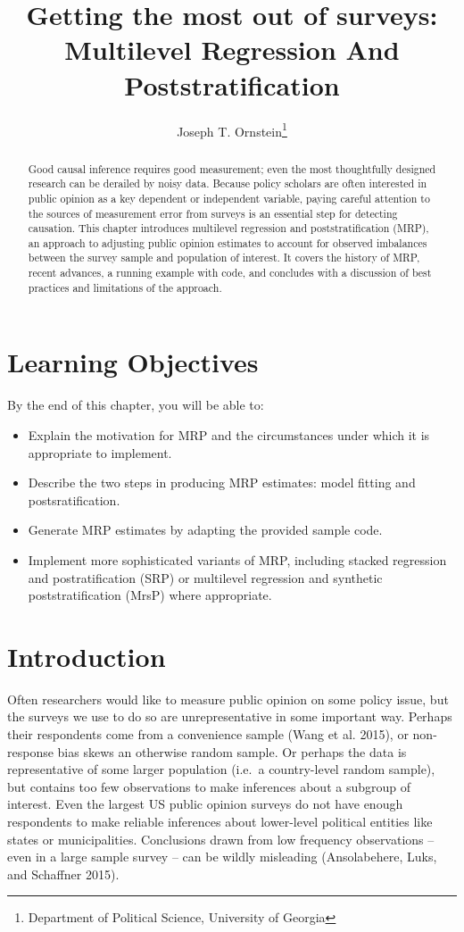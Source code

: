 \documentclass[
]{article}
\title{Getting the most out of surveys: Multilevel Regression And
Poststratification}
\author{Joseph T. Ornstein\footnote{Department of Political Science,
  University of Georgia}}
\date{}
\begin{document}
\maketitle
\begin{abstract}
Good causal inference requires good measurement; even the most
thoughtfully designed research can be derailed by noisy data. Because
policy scholars are often interested in public opinion as a key
dependent or independent variable, paying careful attention to the
sources of measurement error from surveys is an essential step for
detecting causation. This chapter introduces multilevel regression and
poststratification (MRP), an approach to adjusting public opinion
estimates to account for observed imbalances between the survey sample
and population of interest. It covers the history of MRP, recent
advances, a running example with code, and concludes with a discussion
of best practices and limitations of the approach.
\end{abstract}

\hypertarget{learning-objectives}{%
\section{Learning Objectives}\label{learning-objectives}}

By the end of this chapter, you will be able to:

\begin{itemize}
\item
  Explain the motivation for MRP and the circumstances under which it is
  appropriate to implement.
\item
  Describe the two steps in producing MRP estimates: model fitting and
  postsratification.
\item
  Generate MRP estimates by adapting the provided sample code.
\item
  Implement more sophisticated variants of MRP, including stacked
  regression and postratification (SRP) or multilevel regression and
  synthetic poststratification (MrsP) where appropriate.
\end{itemize}

\hypertarget{introduction}{%
\section{Introduction}\label{introduction}}

Often researchers would like to measure public opinion on some policy
issue, but the surveys we use to do so are unrepresentative in some
important way. Perhaps their respondents come from a convenience sample
(Wang et al. 2015), or non-response bias skews an otherwise random
sample. Or perhaps the data is representative of some larger population
(i.e.~a country-level random sample), but contains too few observations
to make inferences about a subgroup of interest. Even the largest US
public opinion surveys do not have enough respondents to make reliable
inferences about lower-level political entities like states or
municipalities. Conclusions drawn from low frequency observations --
even in a large sample survey -- can be wildly misleading (Ansolabehere,
Luks, and Schaffner 2015).
\end{document}
